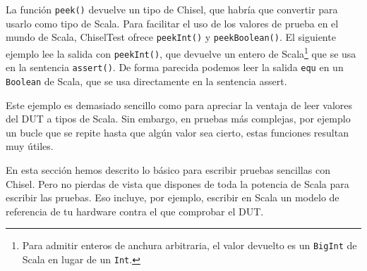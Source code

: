 \documentclass[%
    10pt,
    headinclude, footinclude=false,
    openright, %
    notitlepage,
    cleardoublepage=empty,
    headsepline,
    numbers=noenddot,
    bibliography=totoc, index=totoc,
    ]{scrbook}
\newcommand{\code}[1]{{\lstinline[basicstyle=\small\ttfamily]{#1}}}
\newcommand{\codefoot}[1]{{\lstinline[basicstyle=\footnotesize\ttfamily]{#1}}}
\begin{document}

La función \code{peek()} devuelve un tipo de Chisel, que habría que convertir para usarlo
como tipo de Scala. Para facilitar el uso de los valores de prueba en el mundo de Scala, ChiselTest
ofrece \code{peekInt()} y \code{peekBoolean()}. El siguiente ejemplo lee la salida con \code{peekInt()},
que devuelve un entero de Scala\footnote{Para admitir enteros de anchura arbitraria, el valor
devuelto es un \codefoot{BigInt} de Scala en lugar de un \codefoot{Int}.}
que se usa en la sentencia \code{assert()}.
De forma parecida podemos leer la salida \code{equ} en un \code{Boolean} de Scala, que se usa
directamente en la sentencia assert.



Este ejemplo es demasiado sencillo como para apreciar la ventaja de leer valores del DUT
a tipos de Scala. Sin embargo, en pruebas más complejas, por ejemplo un bucle que se repite hasta que
algún valor sea cierto, estas funciones resultan muy útiles.


En esta sección hemos descrito lo básico para escribir pruebas sencillas con Chisel.
Pero no pierdas de vista que dispones de toda la potencia de Scala para escribir las pruebas.
Eso incluye, por ejemplo, escribir en Scala un modelo de referencia de tu hardware contra el que
comprobar el DUT.
\end{document}
